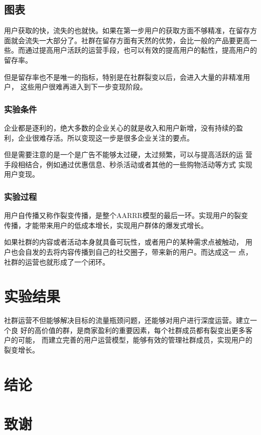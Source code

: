 \documentclass[a4paper,10pt]{article}
\begin{document}
\begin{CJK}{UTF8}{gbsn}
        \subsection{图表}
        用户获取的快，流失的也就快。如果在第一步用户的获取方面不够精准，在留存方
        面就会流失一大部分了。社群在留存方面有天然的优势，会比一般的产品要更高一
        些。而通过提高用户活跃的运营手段，也可以有效的提高用户的黏性，提高用户的
        留存率。

        但是留存率也不是唯一的指标，特别是在社群裂变以后，会进入大量的非精准用户，
        这些用户很难再进入到下一步变现阶段。

            \subsubsection{实验条件}
            企业都是逐利的，绝大多数的企业关心的就是收入和用户新增，没有持续的盈
            利，企业很难存活。所以变现这一步是很多企业关注的要点。

            但是需要注意的是一个是广告不能够太过硬，太过频繁，可以与提高活跃的运
            营手段相结合，例如通过优惠信息、秒杀活动或者其他的一些购物活动等方式
            实现用户变现。

            \subsubsection{实验过程}
            用户自传播又称作裂变传播，是整个AARRR模型的最后一环。实现用户的裂变
            传播，才能带来用户的低成本增长，实现用户群体的爆发式增长。

            如果社群的内容或者活动本身就具备可玩性，或者用户的某种需求点被触动，
            用户也会自发的去将内容传播到自己的社交圈子，带来新的用户。而达成这一
            点，社群的运营也就形成了一个闭环。

    \section{实验结果}
    社群运营不但能够解决目标的流量瓶颈问题，还能够对用户进行深度运营。建立一个良
    好的高价值的群，是商家盈利的重要因素，每个社群成员都有裂变出更多客户的可能，
    而建立完善的用户运营模型，能够有效的管理社群成员，实现用户的裂变增长。

    \section{结论}

    \section{致谢}

\clearpage
\end{CJK}
\end{document}
